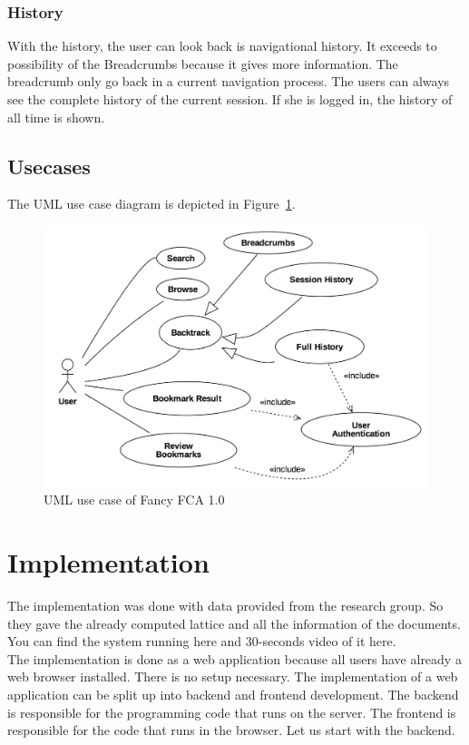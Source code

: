 \documentclass[11pt]{report}
\begin{document}
\subsubsection{History}

With the history, the user can look back is navigational history. It exceeds to possibility of the Breadcrumbs because it gives more information. The breadcrumb only go back in a current navigation process. The users can always see the complete history of the current session. If she is logged in, the history of all time is shown.

\subsection{Usecases}
The UML use case diagram is depicted in Figure~\ref{figure:usecase}.

\begin{figure}[!ht]
	\centering
	\includegraphics[width=\linewidth]{images/usecase}
\caption{UML use case of Fancy FCA 1.0}
\label{figure:usecase}
\end{figure}

\section{Implementation}

The implementation was done with data provided from the research group. So they gave the already computed lattice and all the information of the documents. You can find the system running here and 30-seconds video of it here. \\

The implementation is done as a web application because all users have already a web browser installed. There is no setup necessary. The implementation of a web application can be split up into backend and frontend development. The backend is responsible for the programming code that runs on the server. The frontend is responsible for the code that runs in the browser. Let us start with the backend.
\end{document}
